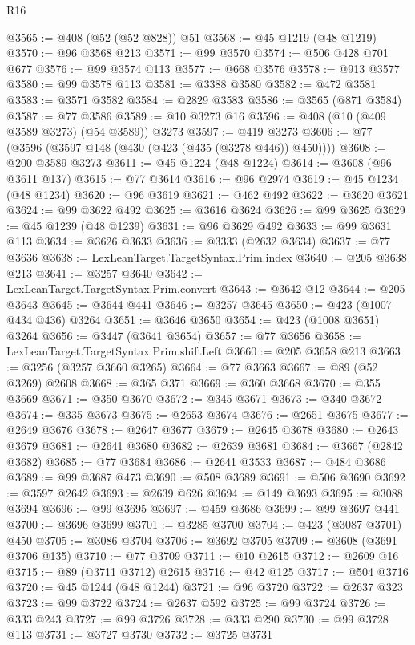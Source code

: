 \begin{lexlean}{R16}
\begin{coremodule}
@3565 := @408 (@52 (@52 @828)) @51
@3568 := @45 @1219 (@48 @1219)
@3570 := @96 @3568 @213
@3571 := @99 @3570
@3574 := @506 @428 @701 @677
@3576 := @99 @3574 @113
@3577 := @668 @3576
@3578 := @913 @3577
@3580 := @99 @3578 @113
@3581 := @3388 @3580
@3582 := @472 @3581
@3583 := @3571 @3582
@3584 := @2829 @3583
@3586 := @3565 (@871 @3584)
@3587 := @77 @3586
@3589 := @10 @3273 @16
@3596 := @408 (@10 (@409 @3589 @3273) (@54 @3589)) @3273
@3597 := @419 @3273
@3606 := @77 (@3596 (@3597 @148 (@430 (@423 (@435 (@3278 @446)) @450))))
@3608 := @200 @3589 @3273
@3611 := @45 @1224 (@48 @1224)
@3614 := @3608 (@96 @3611 @137)
@3615 := @77 @3614
@3616 := @96 @2974
@3619 := @45 @1234 (@48 @1234)
@3620 := @96 @3619
@3621 := @462 @492
@3622 := @3620 @3621
@3624 := @99 @3622 @492
@3625 := @3616 @3624
@3626 := @99 @3625
@3629 := @45 @1239 (@48 @1239)
@3631 := @96 @3629 @492
@3633 := @99 @3631 @113
@3634 := @3626 @3633
@3636 := @3333 (@2632 @3634)
@3637 := @77 @3636
@3638 := LexLeanTarget.TargetSyntax.Prim.index
@3640 := @205 @3638 @213
@3641 := @3257 @3640
@3642 := LexLeanTarget.TargetSyntax.Prim.convert
@3643 := @3642 @12
@3644 := @205 @3643
@3645 := @3644 @441
@3646 := @3257 @3645
@3650 := @423 (@1007 @434 @436) @3264
@3651 := @3646 @3650
@3654 := @423 (@1008 @3651) @3264
@3656 := @3447 (@3641 @3654)
@3657 := @77 @3656
@3658 := LexLeanTarget.TargetSyntax.Prim.shiftLeft
@3660 := @205 @3658 @213
@3663 := @3256 (@3257 @3660 @3265)
@3664 := @77 @3663
@3667 := @89 (@52 @3269) @2608
@3668 := @365 @371
@3669 := @360 @3668
@3670 := @355 @3669
@3671 := @350 @3670
@3672 := @345 @3671
@3673 := @340 @3672
@3674 := @335 @3673
@3675 := @2653 @3674
@3676 := @2651 @3675
@3677 := @2649 @3676
@3678 := @2647 @3677
@3679 := @2645 @3678
@3680 := @2643 @3679
@3681 := @2641 @3680
@3682 := @2639 @3681
@3684 := @3667 (@2842 @3682)
@3685 := @77 @3684
@3686 := @2641 @3533
@3687 := @484 @3686
@3689 := @99 @3687 @473
@3690 := @508 @3689
@3691 := @506 @3690
@3692 := @3597 @2642
@3693 := @2639 @626
@3694 := @149 @3693
@3695 := @3088 @3694
@3696 := @99 @3695
@3697 := @459 @3686
@3699 := @99 @3697 @441
@3700 := @3696 @3699
@3701 := @3285 @3700
@3704 := @423 (@3087 @3701) @450
@3705 := @3086 @3704
@3706 := @3692 @3705
@3709 := @3608 (@3691 @3706 @135)
@3710 := @77 @3709
@3711 := @10 @2615
@3712 := @2609 @16
@3715 := @89 (@3711 @3712) @2615
@3716 := @42 @125
@3717 := @504 @3716
@3720 := @45 @1244 (@48 @1244)
@3721 := @96 @3720
@3722 := @2637 @323
@3723 := @99 @3722
@3724 := @2637 @592
@3725 := @99 @3724
@3726 := @333 @243
@3727 := @99 @3726
@3728 := @333 @290
@3730 := @99 @3728 @113
@3731 := @3727 @3730
@3732 := @3725 @3731

\end{coremodule}
\end{lexlean}
